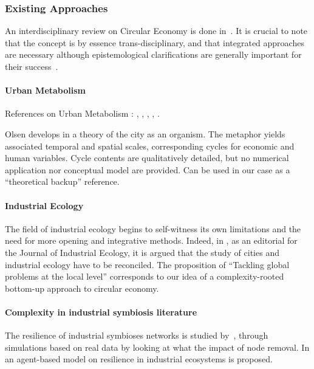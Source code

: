 \documentclass[fleqn,10pt]{wlscirep}
\begin{document}
  

\subsubsection*{Existing Approaches}


An interdisciplinary review on Circular Economy is done in~\cite{ghisellini2016review}. It is crucial to note that the concept is by essence trans-disciplinary, and that integrated approaches are necessary although epistemological clarifications are generally important for their success~\cite{sauve2016environmental}.


\paragraph*{Urban Metabolism}

References on Urban Metabolism : \cite{kennedy2007changing}, \cite{kennedy2011study}, \cite{newcombe1978metabolism}, \cite{bodini2012cities}, \cite{hoornwegmainstreaming}.

Olsen develops in \cite{olsen1982urban} a theory of the city as an organism. The metaphor yields associated temporal and spatial scales, corresponding cycles for economic and human variables. Cycle contents are qualitatively detailed, but no numerical application nor conceptual model are provided. Can be used in our case as a “theoretical backup” reference.


\paragraph{Industrial Ecology}

The field of industrial ecology begins to self-witness its own limitations and the need for more opening and integrative methods. Indeed, in \cite{bai2007industrial}, as an editorial for the Journal of Industrial Ecology, it is argued that the study of cities and industrial ecology have to be reconciled. The proposition of ``Tackling global problems at the local level'' corresponds to our idea of a complexity-rooted bottom-up approach to circular economy.


\paragraph{Complexity in industrial symbiosis literature}

The resilience of industrial symbioses networks is studied by~\cite{li2015resilience}, through simulations based on real data by looking at what the impact of node removal. In \cite{zhu2013exploring} an agent-based model on resilience in industrial ecosystems is proposed.
\end{document}
